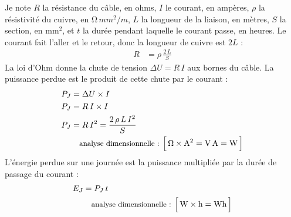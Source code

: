 \begin{demonstration}
Je note $R$ la résistance du câble, en ohms, $I$ le courant, en ampères, $\rho$ la résistivité du cuivre, en $\unit{\ohm\,mm^2/m}$, $L$ la longueur de la liaison, en mètres, $S$ la section, en mm$^2$, et $t$ la durée pendant laquelle le courant passe, en heures. Le courant fait l'aller et le retour, donc la longueur de cuivre est $2L$ :
\begin{align*}
R &= \rho\,\frac{2\,L}{S}
\end{align*}
La loi d'Ohm donne la chute de tension $\Delta U = R\,I$ aux bornes du câble. La puissance perdue est le produit de cette chute par le courant :
\begin{align*}
P_J &= \Delta U \times I\\
P_J &= R\,I \times I\\
P_J &= R\,I^2 = \frac{2\,\rho\,L\,I^2}{S}\\
\dimline{\unit{\ohm}\times\unit{A^2}=\unit{V\,A}=\unit{W}}
\end{align*}
L'énergie perdue sur une journée est la puissance multipliée par la durée de passage du courant :
\begin{align*}
E_J &= P_J\,t\\
\dimline{\unit{W}\times\unit{h}=\unit{Wh}}
\end{align*}
\end{demonstration}

